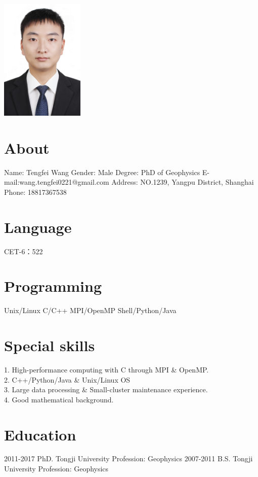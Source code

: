 \documentclass[]{friggeri-encvblackwhite}
\begin{document}
       {}
\begin{aside}
\includegraphics[width=4cm]{IMG_4827small.jpg}
  \section{About}
  Name: Tengfei Wang
  Gender: Male
  Degree: PhD of Geophysics
  E-mail:\quad wang.tengfei0221@gmail.com
  Address: NO.1239, Yangpu District, Shanghai
  Phone: 18817367538
  \section{Language}
  CET-6：522
  \section{Programming}
	Unix/Linux
    C/C++
	MPI/OpenMP
    Shell/Python/Java
\end{aside}

\section{Special skills}
\large
1. High-performance computing with C through MPI \& OpenMP. \\
2. C++/Python/Java \& Unix/Linux OS \\
3. Large data processing \& Small-cluster maintenance experience. \\
4. Good mathematical background.

\section{Education}
\begin{entrylist}
  \entryTwo
    {2011-2017}
    {PhD. \quad Tongji University \quad Profession: Geophysics}
  \entryTwo
    {2007-2011}
    {B.S. \quad Tongji University \quad Profession: Geophysics}
\end{entrylist}
\end{document}
